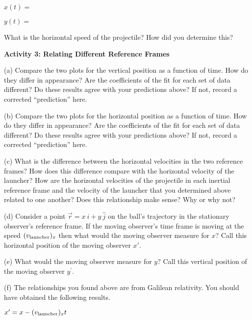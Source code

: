 $x(t) =$
\vspace{5mm}

$y(t) =$
\vspace{5mm}

What is the horizontal speed of the projectile? How did you determine
this?
\vspace{60mm}

\textbf{Activity 3: Relating Different Reference Frames}

(a) Compare the two plots for the vertical position as a function
of time. How do they differ in appearance? Are the coefficients of
the fit for each set of data different? Do these results agree with
your predictions above? If not, record a corrected {}``prediction''
here.
\vspace{20mm}

(b) Compare the two plots for the horizontal position as a function
of time. How do they differ in appearance? Are the coefficients of
the fit for each set of data different? Do these results agree with
your predictions above? If not, record a corrected {}``prediction''
here.
\vspace{17mm}

(c) What is the difference between the horizontal velocities in the
two reference frames? How does this difference compare with the horizontal
velocity of the launcher? How are the horizontal velocities of the
projectile in each inertial reference frame and the velocity of the
launcher that you determined above related to one another? Does this
relationship make sense? Why or why not?
\vspace{15mm}

(d) Consider a point ${\vec r} = x~{\widehat i} + y~{\widehat j}$ on the
ball's trajectory in the stationary observer's reference frame. If
the moving observer's time frame is moving at the speed \( (v_{ \rm launcher})_{x} \)
then what would the moving observer measure for $x$? Call this horizontal
position of the moving observer $x'$.
\vspace{15mm}

(e) What would the moving observer measure for $y$? Call this vertical
position of the moving observer \(y^\prime\).
\vspace{15mm}

(f) The relationships you found above are from Galilean relativity. You
should have obtained the following results.

{\centering \( x'=x-(v_{\rm launcher})_{x}t \)\par}

